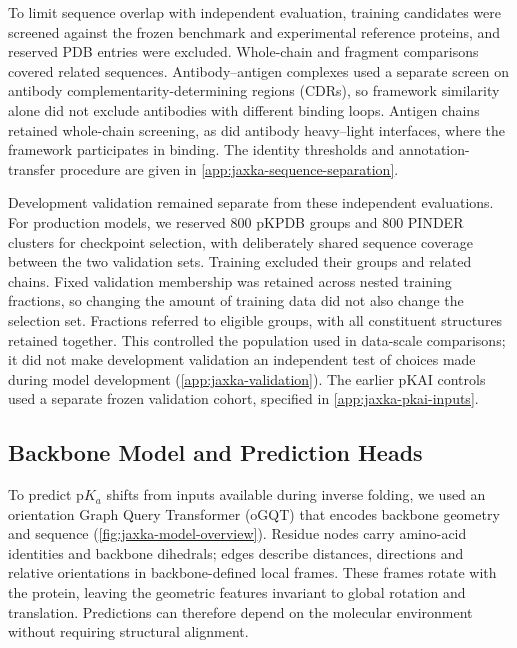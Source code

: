 To limit sequence overlap with independent evaluation, training candidates were screened against the frozen benchmark and experimental reference proteins, and reserved PDB entries were excluded. Whole-chain and fragment comparisons covered related sequences. Antibody--antigen complexes used a separate screen on antibody complementarity-determining regions (CDRs), so framework similarity alone did not exclude antibodies with different binding loops. Antigen chains retained whole-chain screening, as did antibody heavy--light interfaces, where the framework participates in binding. The identity thresholds and annotation-transfer procedure are given in \cref{app:jaxka-sequence-separation}.

Development validation remained separate from these independent evaluations. For production models, we reserved 800 pKPDB groups and 800 PINDER clusters for checkpoint selection, with deliberately shared sequence coverage between the two validation sets. Training excluded their groups and related chains. Fixed validation membership was retained across nested training fractions, so changing the amount of training data did not also change the selection set. Fractions referred to eligible groups, with all constituent structures retained together. This controlled the population used in data-scale comparisons; it did not make development validation an independent test of choices made during model development (\cref{app:jaxka-validation}). The earlier pKAI controls used a separate frozen validation cohort, specified in \cref{app:jaxka-pkai-inputs}.

\subsection{Backbone Model and Prediction Heads}
\label{sec:jaxka-ogqt}

To predict $\mathrm{p}K_a$ shifts from inputs available during inverse folding, we used an orientation Graph Query Transformer (oGQT) that encodes backbone geometry and sequence (\cref{fig:jaxka-model-overview}). Residue nodes carry amino-acid identities and backbone dihedrals; edges describe distances, directions and relative orientations in backbone-defined local frames. These frames rotate with the protein, leaving the geometric features invariant to global rotation and translation. Predictions can therefore depend on the molecular environment without requiring structural alignment.



